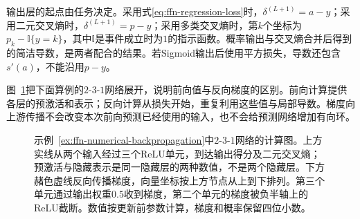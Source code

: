 输出层的起点由任务决定。采用式\eqref{eq:ffn-regression-loss}时，$\delta^{(L+1)}=a-y$；采用二元交叉熵时，$\delta^{(L+1)}=p-y$；采用多类交叉熵时，第$k$个坐标为$p_k-\mathbb{I}\{y=k\}$，其中$\mathbb{I}$是事件成立时为$1$的指示函数。概率输出与交叉熵合并后得到的简洁导数，是两者配合的结果。若Sigmoid输出后使用平方损失，导数还包含$s'(a)$，不能沿用$p-y$。

图~\ref{fig:ffn-backpropagation}把下面算例的$2$-$3$-$1$网络展开，说明前向值与反向梯度的区别。前向计算提供各层的预激活和表示；反向计算从损失开始，重复利用这些值与局部导数。梯度向上游传播不会改变本次前向预测已经使用的输入，也不会给预测网络增加有向环。

\begin{figure}[htb]
  \centering
  
  \caption{示例~\ref{ex:ffn-numerical-backpropagation}中$2$-$3$-$1$网络的计算图。上方实线从两个输入经过三个ReLU单元，到达输出得分及二元交叉熵；预激活与隐藏表示是同一隐藏层的两种数值，不是两个隐藏层。下方赭色虚线反向传播梯度，向量坐标按上方节点从上到下排列。第三个单元通过输出权重$0.5$收到梯度，第二个单元的梯度被负半轴上的ReLU截断。数值按更新前参数计算，梯度和概率保留四位小数。}
  \label{fig:ffn-backpropagation}
\end{figure}

